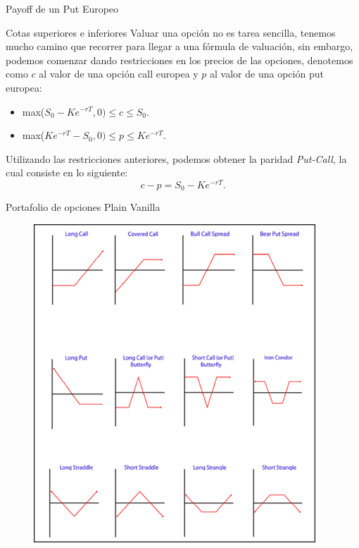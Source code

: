 \documentclass[11pt]{beamer}
\begin{document}
\begin{frame}{Payoff de un Put Europeo}
	\centering
\end{frame}

\begin{frame}{Cotas superiores e inferiores}
Valuar una opción no es tarea sencilla, tenemos mucho camino que recorrer para llegar a una fórmula de valuación, sin embargo, podemos comenzar dando restricciones en los precios de las opciones, denotemos como $c$ al valor de una opción call europea y $p$ al valor de una opción put europea:\bigskip
\begin{itemize}
	\item max($ S_0-Ke^{-rT},0) \leq c \leq S_0$.
	\item max($Ke^{-rT}-S_0,0)  \leq p \leq Ke^{-rT}$.
\end{itemize}
\bigskip
Utilizando las restricciones anteriores, podemos obtener la paridad \textit{Put-Call}, la cual consiste en lo siguiente:
\begin{equation}
c-p=S_0-Ke^{-rT}.
\end{equation}
\end{frame}

\begin{frame}{Portafolio de opciones Plain Vanilla}
	\begin{figure}
		\centering
		\includegraphics[width=0.6\linewidth]{portafolio}
		\caption{}
		\label{fig:portafolio}
	\end{figure}
	
\end{frame}
\end{document}
